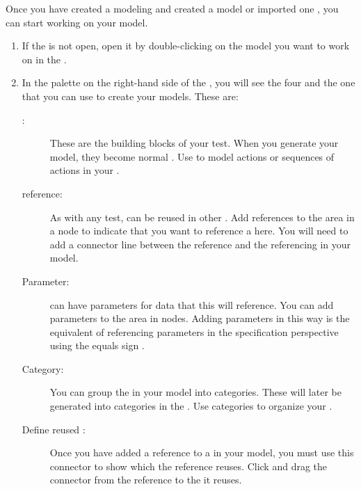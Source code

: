 
Once you have created a modeling \gdproject{}  and created a model  or imported one , you can start working on your model. 

\begin{enumerate}
\item If the \gdmodeleditor{} is not open, open it by double-clicking on the model you want to work on in the \gdnavview{}. 
\item In the palette on the right-hand side of the \gdmodeleditor{}, you will see the four  and the one  that you can use to create your models. These are:
\begin{description}
\item [\gdcase{}:]{These are the building blocks of your test. When you generate your model, they become normal \app{} \gdcases{} . Use \gdcases{} to model actions or sequences of actions in your \gdaut{}. }
\item [\gdcase{} reference:]{As with any \app{} test, \gdcases{} can be reused in other \gdcases{}. Add \gdcase{} references to the  area in a \gdcase{} node to indicate that you want to reference a \gdcase{} here. You will need to add a connector line between the \gdcase{} reference and the referencing \gdcase{} in your model.} 
\item [Parameter:]{\gdcases{} can have parameters for data that this \gdcase{} will reference. You can add parameters to the  area in \gdcase{} nodes. Adding parameters in this way is the equivalent of referencing parameters in the specification perspective using the equals sign .}
\item [Category:]{You can group the \gdcases{} in your model into categories. These will later be generated into \app{} categories in the \gdtestcasebrowser{} . Use categories to organize your \gdcases{}.}
\item [Define reused \gdcase{}:]{Once you have added a \gdcase{} reference to a \gdcase{} in your model, you must use this connector to show which \gdcase{} the reference reuses. Click and drag the connector from the \gdcase{} reference to the \gdcase{} it reuses.}
\end{description}
\end{enumerate}

